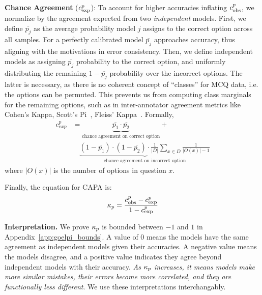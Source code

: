     \textbf{Chance Agreement} ($c_{\text{exp}}^{p}$): To account for higher accuracies inflating $c_{\text{obs}}^{p}$, we normalize by the agreement expected from two \textit{independent} models. First, we define $\overline{p_j}$ as the average probability model $j$ assigns to the correct option across all samples. For a perfectly calibrated model $\overline{p_j}$ approaches accuracy, thus aligning with the motivations in error consistency. Then, we define independent models as assigning $\overline{p_j}$ probability to the correct option, and uniformly distributing the remaining $1 - \overline{p_j}$ probability over the incorrect options. The latter is necessary, as there is no coherent concept of ``classes'' for MCQ data, i.e. the options can be permuted. This prevents us from computing class marginals for the remaining options, such as in inter-annotator agreement metrics like Cohen's Kappa, Scott's Pi~\citep{scott1955reliability}, Fleiss' Kappa~\citep{fleiss1981measurement}. 
    Formally, 
\begin{equation}
\begin{split}
    c_{exp}^{p} &= \underbrace{\overline{p_1} \cdot \overline{p_2}}_{\text{chance agreement on correct option}} + \\ 
    &\quad \underbrace{(1 - \overline{p_1}) \cdot (1 - \overline{p_2}) \cdot \frac{1}{|D|} \sum_{x \in D} \frac{1}{|O(x)|-1}}_{\text{chance agreement on incorrect option}}
\end{split}
\end{equation}
    where $|O(x)|$ is the number of options in question $x$.

Finally, the equation for CAPA is:
\begin{equation}
\kappa_{p} = \frac{c_{\text{obs}}^{p} - c_{\text{exp}}^{p}}{1 - c_{\text{exp}}^{p}}
\end{equation} 

\textbf{Interpretation.} We prove $\kappa_{p}$ is bounded between $-1$ and $1$ in Appendix~\ref{app:goelpi_bounds}. A value of 0 means the models have the same agreement as independent models given their accuracies. A negative value means the models disagree, and a positive value indicates they agree beyond independent models with their accuracy. \textit{As $\kappa_{p}$ increases, it means models make more similar mistakes, their errors become more correlated, and they are functionally less different}. We use these interpretations interchangably. 

